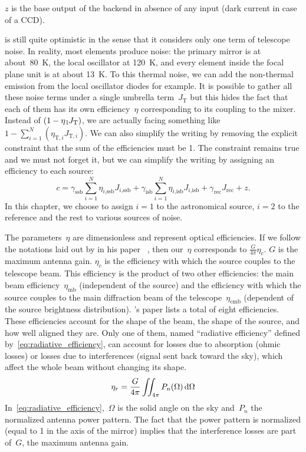 $z$ is the base output of the backend in absence of any input (dark current in case of a CCD).

 is still quite optimistic in the sense that it considers only one term of telescope noise.
In reality, most elements produce noise: the primary mirror is at about~\SI{80}{\kelvin}, the local oscillator at \SI{120}{\kelvin}, and every element inside the focal plane unit is at about \SI{13}{\kelvin}.
To this thermal noise, we can add the non-thermal emission from the local oscillator diodes for example.
It is possible to gather all these noise terms under a single umbrella term~$J_\text{T}$ but this hides the fact that each of them has its own efficiency~$\eta$ corresponding to its coupling to the mixer.
Instead of $(1-\eta_\text{\,l} J_\text{T})$, we are actually facing something like
$1 - \sum_{i=1}^N (\eta_{\text{T}, i} J_{\text{T}, i})$.
We can also simplify the writing by removing the explicit constraint that the sum of the efficiencies must be 1.
The constraint remains true and we must not forget it, but we can simplify the writing by assigning an efficiency to each source:
\begin{equation}
    c =
    \gamma_\text{ssb}
    \sum_{i=1}^N \eta_{i\text{,ssb}} J_{i\text{,ssb}}
    +
    \gamma_\text{isb}
    \sum_{i=1}^N \eta_{i\text{,isb}} J_{i\text{,isb}}
    + \gamma_\text{rec} J_\text{rec} + z%
    \text{.}
\end{equation}
In this chapter, we choose to assign $i=1$  to the astronomical source,
$i=2$ to the reference
and the rest to various sources of noise.

The parameters~$\eta$ are dimensionless and represent optical efficiencies.
If we follow the notations laid out by \citeauthor{mangum2006tempscales} in his paper ~\cite{mangum2006tempscales},
then our~$\eta$ corresponds to $\frac{G}{4\pi}\eta_c$.
$G$ is the maximum antenna gain.
$\eta_c$ is the efficiency with which the source couples to the telescope beam.
This efficiency is the product of two other efficiencies:
the main beam efficiency~$\eta_\text{mb}$ (independent of the source)
and
the efficiency with which the source couples to the main diffraction beam of the telescope~$\eta_\text{cmb}$ (dependent of the source brightness distribution).
\citeauthor{mangum2006tempscales}'s paper lists a total of eight efficiencies.
These efficiencies account for the shape of the beam, the shape of the source, and how well aligned they are. 
Only one of them, named ``radiative efficiency'' defined by~\cref{eq:radiative_efficiency}, can account for losses due to absorption (ohmic losses) or losses due to interferences (signal sent back toward the sky), which affect the whole beam without changing its shape.
\begin{equation}
    \eta_r = \frac{G}{4\pi} \iint_{4\pi} P_n(\Omega)\textrm{\,d}\Omega \label{eq:radiative_efficiency}
\end{equation}
In~\cref{eq:radiative_efficiency},~$\Omega$ is the solid angle on the sky and~$P_n$ the normalized antenna power pattern.
The fact that the power pattern is normalized (equal to 1 in the axis of the mirror) implies that the interference losses are part of~$G$, the maximum antenna gain.

